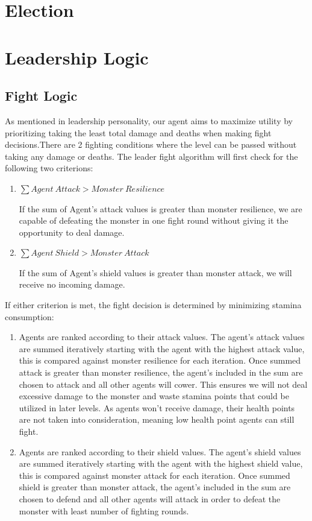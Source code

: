 \section{Election}

\section{Leadership Logic}
\subsection{Fight Logic}
\noindent As mentioned in leadership personality, our agent aims to maximize utility by prioritizing taking the least total damage and deaths when making fight decisions.There are 2 fighting conditions where the level can be passed without taking any damage or deaths. The leader fight algorithm will first check for the following two criterions: 

\begin{enumerate}
\item  $\sum{Agent~Attack>Monster~Resilience}$
\

\noindent If the sum of Agent's attack values is greater than monster resilience, we are capable of defeating the monster in one fight round without giving it the opportunity to deal damage.

\item  $\sum{Agent~Shield>Monster~Attack}$


\noindent If the sum of Agent's shield values is greater than monster attack, we will receive no incoming damage.
\end{enumerate}
\noindent If either criterion is met, the fight decision is determined by minimizing stamina consumption:

\begin{enumerate}
\item  Agents are ranked according to their attack values. The agent's attack values are summed iteratively starting with the agent with the highest attack value, this is compared against monster resilience for each iteration. Once summed attack is greater than monster resilience, the agent's included in the sum are chosen to attack and all other agents will cower. This ensures we will not deal excessive damage to the monster and waste stamina points that could be utilized in later levels. As agents won't receive damage, their health points are not taken into consideration, meaning low health point agents can still fight.

\noindent 

\item  Agents are ranked according to their shield values. The agent's shield values are summed iteratively starting with the agent with the highest shield value, this is compared against monster attack for each iteration. Once summed shield is greater than monster attack, the agent's included in the sum are chosen to defend and all other agents will attack in order to defeat the monster with least number of fighting rounds.
\end{enumerate}

